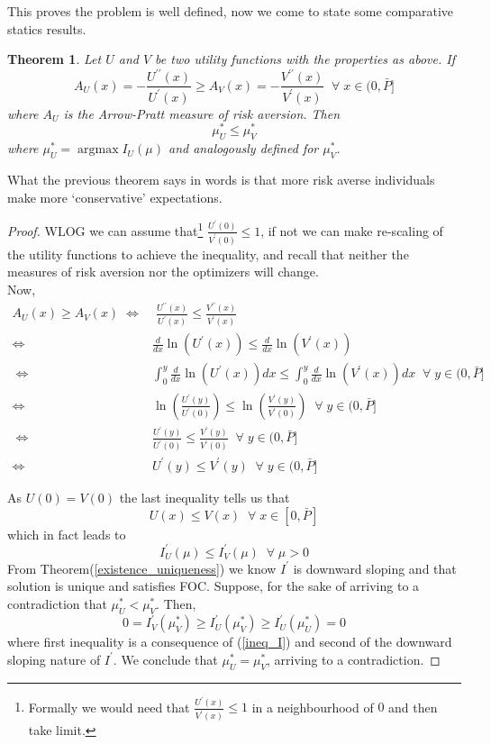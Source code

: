 \documentclass[10pt]{article}
\newtheorem{theorem}{Theorem}
\begin{document}
This proves the problem is well defined, now we come to state some comparative statics results.

\begin{theorem}
\label{th_riskaverse}
Let $U$ and $V$ be two utility functions with the properties as above. If
\[A_U(x)=-\frac{U^{\prime\prime}(x)}{U^{\prime}(x)}\geq A_V(x)=-\frac{V^{\prime\prime}(x)}{V^{\prime}(x)}\;\;\forall\;x\in(0,\bar{P}]\]
where $A_U$ is the Arrow-Pratt measure of risk aversion. Then 
\[\mu^{*}_U\leq \mu^{*}_V\]
where $\mu_U^{*}=\operatorname{argmax} I_U(\mu)$ and analogously defined for  $\mu^{*}_V$.
\end{theorem}

What the previous theorem says in words is that more risk averse individuals make more `conservative' expectations.

\begin{proof}
WLOG we can assume that\footnote{Formally we would need that $\frac{U^{\prime}(x)}{V^{\prime}(x)}\leq 1$   in a neighbourhood of $0$ and then take limit.} $\frac{U^{\prime}(0)}{V^{\prime}(0)}\leq 1$, if not we can make re-scaling of the utility functions to achieve the inequality, and recall that neither the measures of risk aversion nor the optimizers will change. \\

Now,
\begin{align*}
A_U(x)\geq A_V(x)\; \Longleftrightarrow & \; \frac{U^{\prime\prime}(x)}{U^{\prime}(x)}\leq \frac{V^{\prime\prime}(x)}{V^{\prime}(x)} \\
\Longleftrightarrow \; & \frac{d}{dx}\ln(U^{\prime}(x))\leq \frac{d}{dx}\ln(V^{\prime}(x))\\
\;\Longleftrightarrow & \int_0^{y}\frac{d}{dx}\ln(U^{\prime}(x))dx\leq \int_0^{y}\frac{d}{dx}\ln(V^{\prime}(x))dx \;\;\forall\; y\in(0,\bar{P}]\\
\Longleftrightarrow \; & \ln(\frac{U^{\prime}(y)}{U^{\prime}(0)})\leq \ln(\frac{V^{\prime}(y)}{V^{\prime}(0)})\;\;\forall\; y\in(0,\bar{P}]\\
\; \Longleftrightarrow & \frac{U^{\prime}(y)}{U^{\prime}(0)}\leq \frac{V^{\prime}(y)}{V^{\prime}(0)}\;\;\forall\; y\in(0,\bar{P}] \\
\Longleftrightarrow \; & U^{\prime}(y)\leq V^{\prime}(y)\;\;\forall\; y\in(0,\bar{P}]
\end{align*}

As $U(0)=V(0)$ the last inequality tells us that
\[U(x)\leq V(x)\;\;\forall\; x\in[0,\bar{P}]\]
 which in fact leads to 
 \begin{equation}
 \label{ineq_I}
     I^{\prime}_U(\mu)\leq I^{\prime}_V(\mu)\;\;\forall\; \mu>0
 \end{equation}
 From Theorem(\ref{existence_uniqueness}) we know $I^{\prime}$ is downward sloping and that solution is unique and satisfies FOC. Suppose, for the sake of arriving to a contradiction that $\mu_U^*<\mu_V^*$. Then,
 \[ 0=I_V^{\prime}(\mu^{*}_V)\geq I_U^{\prime}(\mu^{*}_V)\geq I_U^{\prime}(\mu^{*}_U)=0 \]
 where first inequality is a consequence of (\ref{ineq_I}) and second of the downward sloping nature of $I^\prime$. We conclude that $\mu_U^*=\mu_V^*$, arriving to a contradiction.
\end{proof}
\end{document}
